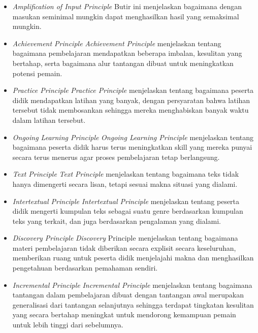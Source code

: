 \begin{itemize}
		\item \textit{Amplification of Input Principle}
			\subitem Butir ini menjelaskan bagaimana dengan masukan seminimal mungkin dapat menghasilkan hasil yang semaksimal mungkin.
		\item \textit{Achievement Principle}
			\subitem \textit{Achievement Principle} menjelaskan tentang bagaimana pembelajaran mendapatkan beberapa imbalan, kesulitan yang bertahap, serta bagaimana alur tantangan  dibuat untuk meningkatkan potensi pemain.
		\item \textit{Practice Principle}
			\subitem \textit{Practice Principle} menjelaskan tentang bagaimana peserta didik mendapatkan latihan yang banyak, dengan persyaratan bahwa latihan tersebut tidak membosankan sehingga mereka menghabiskan banyak waktu dalam latihan tersebut.
		\item \textit{Ongoing Learning Principle}
			\subitem \textit{Ongoing Learning Principle} menjelaskan tentang bagaimana peserta didik harus terus meningkatkan skill yang mereka punyai secara terus menerus agar proses pembelajaran tetap berlangsung.
		\item \textit{Text Principle}
			\subitem \textit{Text Principle} menjelaskan tentang bagaimana teks tidak hanya dimengerti secara lisan, tetapi sesuai makna situasi yang dialami.
		\item \textit{Intertextual Principle}
			\subitem \textit{Intertextual Principle} menjelaskan tentang peserta didik mengerti kumpulan teks sebagai suatu genre berdasarkan kumpulan teks yang terkait, dan juga berdasarkan pengalaman yang dialami.
		\item \textit{Discovery Principle}
			\subitem \textit{Discovery} Principle menjelaskan tentang bagaimana materi pembelajaran tidak diberikan secara explisit secara keseluruhan, memberikan ruang untuk peserta didik menjelajahi makna dan menghasilkan pengetahuan berdasarkan pemahaman sendiri.
		\item \textit{Incremental Principle}
			\subitem \textit{Incremental Principle} menjelaskan tentang bagaimana tantangan dalam pembelajaran dibuat dengan tantangan awal merupakan generalisasi dari tantangan selanjutnya sehingga terdapat tingkatan kesulitan yang secara bertahap meningkat untuk mendorong kemampuan pemain untuk lebih tinggi dari sebelumnya.
		
	\end{itemize}


